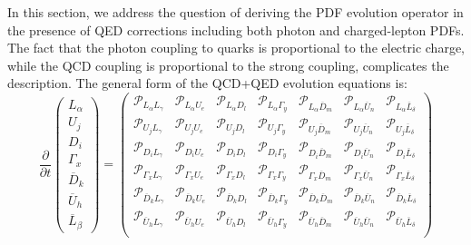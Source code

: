 \documentclass[10pt,a4paper]{article}
\begin{document}
In this section, we address the question of deriving the PDF evolution
operator in the presence of QED corrections including both photon and
charged-lepton PDFs. The fact that the photon coupling to quarks is
proportional to the electric charge, while the QCD coupling is
proportional to the strong coupling, complicates the description. The
general form of the QCD+QED evolution equations is:
\begin{equation}
\frac{\partial}{\partial t}
\begin{pmatrix}
L_\alpha\\
U_j \\
D_i\\
\Gamma_x\\
\overline{D}_k\\
\overline{U}_h\\
\overline{L}_\beta
\end{pmatrix} =
\begin{pmatrix}
\mathcal{P}_{L_\alpha L_\gamma} & \mathcal{P}_{L_\alpha U_e} & \mathcal{P}_{L_\alpha D_l}& \mathcal{P}_{L_\alpha \Gamma_y} & \mathcal{P}_{L_\alpha \overline{D}_m} & \mathcal{P}_{L_\alpha \overline{U}_n} & \mathcal{P}_{L_\alpha \overline{L}_\delta} \\ 
\mathcal{P}_{U_jL_\gamma} & \mathcal{P}_{U_jU_e} & \mathcal{P}_{U_jD_l} & \mathcal{P}_{U_j\Gamma_y} & \mathcal{P}_{U_j\overline{D}_m} & \mathcal{P}_{U_j\overline{U}_n} & \mathcal{P}_{U_j\overline{L}_\delta} \\ 
\mathcal{P}_{D_iL_\gamma} & \mathcal{P}_{D_iU_e} & \mathcal{P}_{D_iD_l} & \mathcal{P}_{D_i\Gamma_y} & \mathcal{P}_{D_i\overline{D}_m} & \mathcal{P}_{D_i\overline{U}_n} & \mathcal{P}_{D_i\overline{L}_\delta} \\ 
\mathcal{P}_{\Gamma_x L_\gamma} & \mathcal{P}_{\Gamma_x U_e} & \mathcal{P}_{\Gamma_x D_l} & \mathcal{P}_{\Gamma_x\Gamma_y} & \mathcal{P}_{\Gamma_x\overline{D}_m} & \mathcal{P}_{\Gamma_x\overline{U}_n} & \mathcal{P}_{\Gamma_x\overline{L}_\delta}\\
\mathcal{P}_{\overline{D}_kL_\gamma} & \mathcal{P}_{\overline{D}_kU_e} & \mathcal{P}_{\overline{D}_kD_l} & \mathcal{P}_{\overline{D}_k\Gamma_y} & \mathcal{P}_{\overline{D}_k\overline{D}_m} & \mathcal{P}_{\overline{D}_k\overline{U}_n} & \mathcal{P}_{\overline{D}_k\overline{L}_\delta}\\
\mathcal{P}_{\overline{U}_hL_\gamma} & \mathcal{P}_{\overline{U}_hU_e} & \mathcal{P}_{\overline{U}_hD_l} & \mathcal{P}_{\overline{U}_h\Gamma_y} & \mathcal{P}_{\overline{U}_h\overline{D}_m} & \mathcal{P}_{\overline{U}_h\overline{U}_n} & \mathcal{P}_{\overline{U}_h\overline{L}_\delta}\\

\end{pmatrix}
\end{equation}
\end{document}
